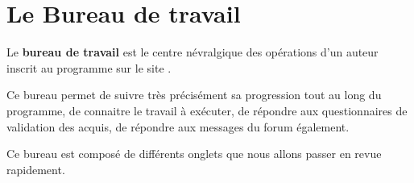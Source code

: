 \chapter{Le Bureau de travail}\label{bureautravail}

Le \textbf{bureau de travail} est le centre névralgique des opérations d'un auteur inscrit au programme \unan{} sur le site \boa. 

Ce bureau permet de suivre très précisément sa progression tout au long du programme, de connaitre le travail à exécuter, de répondre aux questionnaires de validation des acquis, de répondre aux messages du forum également.

Ce bureau est composé de différents onglets que nous allons passer en revue rapidement.

